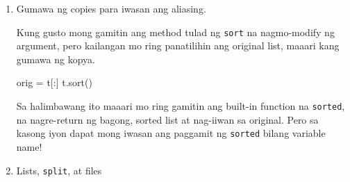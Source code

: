 \documentclass[10pt,]{book}
\newenvironment{Shaded}{}{}
\newcommand{\CommentTok}[1]{\textcolor[rgb]{0.38,0.63,0.69}{\textit{#1}}}
\newcommand{\NormalTok}[1]{#1}
\newcommand{\OperatorTok}[1]{\textcolor[rgb]{0.40,0.40,0.40}{#1}}
\begin{document}
\begin{enumerate}
  Para magdagdag ng element, maaari mong gamitin ang \texttt{append}
  method o ang \texttt{+} operator. Pero huwag kalimutan na ang mga ito
  ay tama:

\begin{Shaded}
\begin{Highlighting}[]
\NormalTok{t.append(x)}
\NormalTok{t }\OperatorTok{=}\NormalTok{ t }\OperatorTok{+}\NormalTok{ [x]}
\end{Highlighting}
\end{Shaded}

  At ang mga ito ay mali:

\begin{Shaded}
\begin{Highlighting}[]
\NormalTok{t.append([x])          }\CommentTok{\# WRONG!}
\NormalTok{t }\OperatorTok{=}\NormalTok{ t.append(x)        }\CommentTok{\# WRONG!}
\NormalTok{t }\OperatorTok{+}\NormalTok{ [x]                }\CommentTok{\# WRONG!}
\NormalTok{t }\OperatorTok{=}\NormalTok{ t }\OperatorTok{+}\NormalTok{ x              }\CommentTok{\# WRONG!}
\end{Highlighting}
\end{Shaded}

  Subukan ang bawat isa sa mga halimbawang ito sa interactive mode para
  masiguro na naiintindihan mo ang ginagawa nila. Pansinin na ang huli
  lang ang nagdudulot ng runtime error; ang iba pang tatlo ay legal,
  pero mali ang ginagawa nila.
\item
  Gumawa ng copies para iwasan ang aliasing.

   

  Kung gusto mong gamitin ang method tulad ng \texttt{sort} na
  nagmo-modify ng argument, pero kailangan mo ring panatilihin ang
  original list, maaari kang gumawa ng kopya.

\begin{Shaded}
\begin{Highlighting}[]
\NormalTok{orig }\OperatorTok{=}\NormalTok{ t[:]}
\NormalTok{t.sort()}
\end{Highlighting}
\end{Shaded}

  Sa halimbawang ito maaari mo ring gamitin ang built-in function na
  \texttt{sorted}, na nagre-return ng bagong, sorted list at nag-iiwan
  sa original. Pero sa kasong iyon dapat mong iwasan ang paggamit ng
  \texttt{sorted} bilang variable name!
\item
  Lists, \texttt{split}, at files


\end{enumerate}
\end{document}
